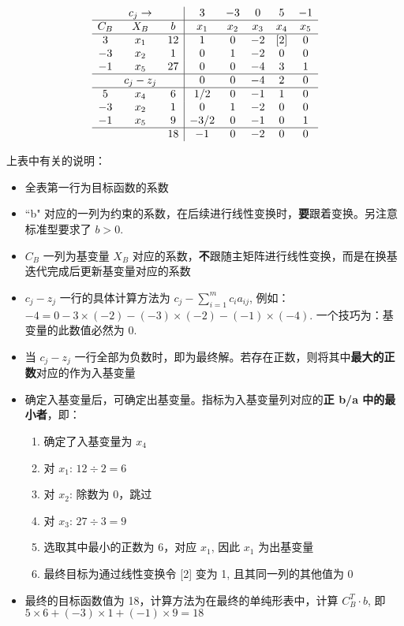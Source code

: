 \documentclass[UTF8, 6pt]{ctexart}
\newcommand{\mcompress}{\vspace{-10 px}}
\begin{document}
\mcompress
\[
\begin{array}{ccc|ccccc}
	    & c_j \rightarrow &    &  3   & -3  &  0  &  5  & -1  \\\hline
	C_B &       X_B       & b  & x_1  & x_2 & x_3 & x_4 & x_5 \\ \hline
	 3  &       x_1       & 12 &  1   &  0  & -2  & [2] &  0  \\
	-3  &       x_2       & 1  &  0   &  1  & -2  &  0  &  0  \\
	-1  &       x_5       & 27 &  0   &  0  & -4  &  3  &  1  \\ \hline
	    &    c_j - z_j    &    &  0   &  0  & -4  &  2  &  0  \\ \hline
	 5  &       x_4       & 6  & 1/2  &  0  & -1  &  1  &  0  \\
	-3  &       x_2       & 1  &  0   &  1  & -2  &  0  &  0  \\
	-1  &       x_5       & 9  & -3/2 &  0  & -1  &  0  &  1  \\ \hline
	    &                 & 18 &  -1  &  0  & -2  &  0  &  0
\end{array}
\]
\mcompress

上表中有关的说明：

\begin{itemize}
	\item 全表第一行为目标函数的系数
	\item ``b" 对应的一列为约束的系数，在后续进行线性变换时，\textbf{要}跟着变换。另注意标准型要求了 $b>0$.
	\item $C_B$ 一列为基变量 $X_B$ 对应的系数，\textbf{不}跟随主矩阵进行线性变换，而是在换基迭代完成后更新基变量对应的系数
	\item $c_j - z_j$ 一行的具体计算方法为 $c_j - \sum \limits_{i=1}^{m}c_i a_{ij}$, 例如：$-4 = 0 - 3 \times (-2) - (-3)\times (-2) - (-1)\times (-4)$. 一个技巧为：基变量的此数值必然为 0.
	\item 当 $c_j - z_j$ 一行全部为负数时，即为最终解。若存在正数，则将其中\textbf{最大的正数}对应的作为入基变量
	\item 确定入基变量后，可确定出基变量。指标为入基变量列对应的\textbf{正 b/a 中的最小者}，即：
	\begin{enumerate}
		\item 确定了入基变量为 $x_4$
		\item 对 $x_1$: $12\div 2 = 6$
		\item 对 $x_2$: 除数为 0，跳过
		\item 对 $x_3$: $27 \div 3 = 9$
		\item 选取其中最小的正数为 6，对应 $x_1$, 因此 $x_1$ 为出基变量
		\item 最终目标为通过线性变换令 [2] 变为 1, 且其同一列的其他值为 0
	\end{enumerate}
\item 最终的目标函数值为 18，计算方法为在最终的单纯形表中，计算 $C_B^T \cdot b$, 即 $5\times 6 +(-3) \times 1 + (-1)\times 9 = 18$
\end{itemize}
\end{document}
